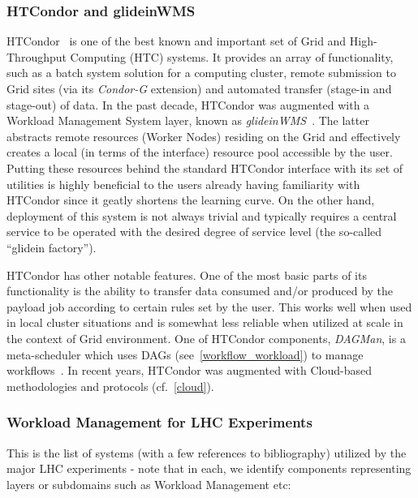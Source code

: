 \subsubsection{HTCondor and glideinWMS}
\label{htcondor}
HTCondor~\cite{htcondor} is one of the best known and  important set of Grid and High-Throughput Computing (HTC) systems. It provides an array of functionality, such as
a batch system solution for a computing cluster, remote submission to Grid sites (via its \textit{Condor-G} extension) and automated transfer (stage-in and stage-out) of data.
In the past decade, HTCondor was augmented with a  Workload Management System layer, known as \textit{glideinWMS}~\cite{glideinwms}. The latter abstracts remote
resources (Worker Nodes) residing on the Grid and effectively creates a local (in terms of the interface) resource pool accessible by the user.
Putting these resources behind the standard HTCondor interface with its set of utilities is highly beneficial to the users already having familiarity with HTCondor since it geatly shortens the learning curve.
On the other hand, deployment of this system is not always trivial and typically requires a central service to be operated with the desired degree of service level (the so-called ``glidein factory'').

HTCondor has other notable features. One of the most basic parts of its functionality is the ability to transfer data consumed and/or produced by the payload job according to
certain rules set by the user. This works well when used in local cluster situations and is somewhat less reliable when utilized at scale in the context of Grid environment.
One of HTCondor components, \textit{DAGMan}, is a meta-scheduler which uses DAGs (see~\ref{workflow_workload}) to manage workflows~\cite{dagman}. In recent years,
HTCondor was augmented  with Cloud-based methodologies and protocols (cf.~\ref{cloud}).

\subsubsection{Workload Management for LHC Experiments}
This is the list of systems (with a few references to bibliography) utilized by the major LHC experiments - note that in each, we identify components representing layers or subdomains such as Workload Management etc:

